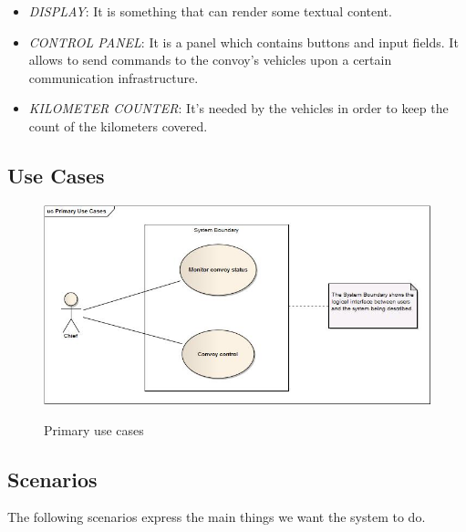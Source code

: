 \documentclass{llncs}
\newcommand{\labelfig}[1]{\label{fig:#1}}
\begin{document}
\begin{itemize}
  \item \emph{DISPLAY}: It is something that can render some textual content.\\

  \item \emph{CONTROL PANEL}: It is a panel which contains buttons and input fields. It allows to send commands to the convoy's vehicles upon a certain communication infrastructure.\\

  \item \emph{KILOMETER COUNTER}: It's needed by the vehicles in order to keep the count of the kilometers covered.\\

\end{itemize}

\subsection{Use Cases}

\begin{figure}
   \centering
   \includegraphics[scale = 0.5]{../Diagrams/Primary_Use_Cases.jpg}\\
  \caption{Primary use cases}\labelfig{testTypes}
\end{figure}

\subsection{Scenarios}
The following scenarios express the main things we want the system to do. 
\end{document}
